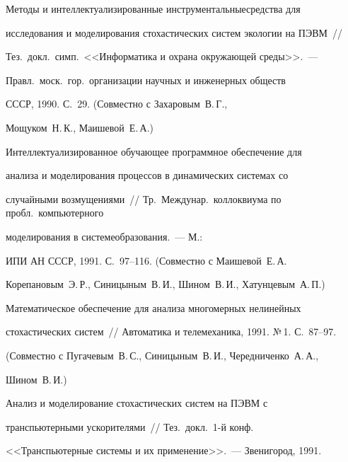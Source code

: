  Методы и интеллектуализированные инструментальные\linebreak средства для


исследования и моделирования стохастических систем экологии на ПЭВМ~//


Тез.\ докл.\ симп.\ <<Информатика и охрана окружающей среды>>.~---


Правл.\ моск.\ гор.\ организации научных и инженерных обществ


СССР, 1990. С.~29. (Совместно с Захаровым~В.\,Г.,


Мощуком~Н.\,К., Маишевой~Е.\,А.)


\vspace*{-3pt}







\vspace*{-1.5pt}





 Интеллектуализированное обучающее программное обеспечение для


анализа и моделирования процессов в динамических системах со


случайными возмущениями~// Тр.\ Междунар.\ коллоквиума по пробл.\ компьютерного


моделирования в системе\linebreak образования.~--- М.:


ИПИ АН СССР, 1991. С.~97--116. (Совместно с Маишевой~Е.\,А.


Корепановым~Э.\,Р., Синицыным~В.\,И., Шином~В.\,И., Хатунцевым~А.\,П.)





 Математическое обеспечение для анализа многомерных нелинейных


стохастических систем~// Автоматика и телемеханика, 1991. №\,1. С.~87--97.


(Совместно с Пугачевым~В.\,С., Синицыным~В.\,И., Чередниченко~А.\,А.,


Шином~В.\,И.)





 Анализ и моделирование стохастических систем на ПЭВМ с


транс\-пью\-тер\-ны\-ми ускорителями~// Тез.\ докл.\ 1-й конф.\


<<Транспьютерные системы и их применение>>.~--- Звенигород, 1991.\linebreak


